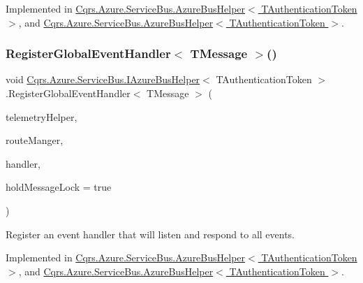 Implemented in \hyperlink{classCqrs_1_1Azure_1_1ServiceBus_1_1AzureBusHelper_aa4ef095148aae1af508fcd7b51f538d3_aa4ef095148aae1af508fcd7b51f538d3}{Cqrs.\+Azure.\+Service\+Bus.\+Azure\+Bus\+Helper$<$ T\+Authentication\+Token $>$}, and \hyperlink{classCqrs_1_1Azure_1_1ServiceBus_1_1AzureBusHelper_aa4ef095148aae1af508fcd7b51f538d3_aa4ef095148aae1af508fcd7b51f538d3}{Cqrs.\+Azure.\+Service\+Bus.\+Azure\+Bus\+Helper$<$ T\+Authentication\+Token $>$}.

\mbox{\label{interfaceCqrs_1_1Azure_1_1ServiceBus_1_1IAzureBusHelper_aef39e7d297ccaa36b02ccc3012dc5906_aef39e7d297ccaa36b02ccc3012dc5906}} 
\subsubsection{\texorpdfstring{Register\+Global\+Event\+Handler$<$ T\+Message $>$()}{RegisterGlobalEventHandler< TMessage >()}}
{\footnotesize\ttfamily void \hyperlink{interfaceCqrs_1_1Azure_1_1ServiceBus_1_1IAzureBusHelper}{Cqrs.\+Azure.\+Service\+Bus.\+I\+Azure\+Bus\+Helper}$<$ T\+Authentication\+Token $>$.Register\+Global\+Event\+Handler$<$ T\+Message $>$ (\begin{DoxyParamCaption}\item[{I\+Telemetry\+Helper}]{telemetry\+Helper,  }\item[{\hyperlink{classCqrs_1_1Bus_1_1RouteManager}{Route\+Manager}}]{route\+Manger,  }\item[{Action$<$ T\+Message $>$}]{handler,  }\item[{bool}]{hold\+Message\+Lock = {\ttfamily true} }\end{DoxyParamCaption})}



Register an event handler that will listen and respond to all events. 



Implemented in \hyperlink{classCqrs_1_1Azure_1_1ServiceBus_1_1AzureBusHelper_af2835c64fbc1d3aaadb5f1a02705f125_af2835c64fbc1d3aaadb5f1a02705f125}{Cqrs.\+Azure.\+Service\+Bus.\+Azure\+Bus\+Helper$<$ T\+Authentication\+Token $>$}, and \hyperlink{classCqrs_1_1Azure_1_1ServiceBus_1_1AzureBusHelper_af2835c64fbc1d3aaadb5f1a02705f125_af2835c64fbc1d3aaadb5f1a02705f125}{Cqrs.\+Azure.\+Service\+Bus.\+Azure\+Bus\+Helper$<$ T\+Authentication\+Token $>$}.

